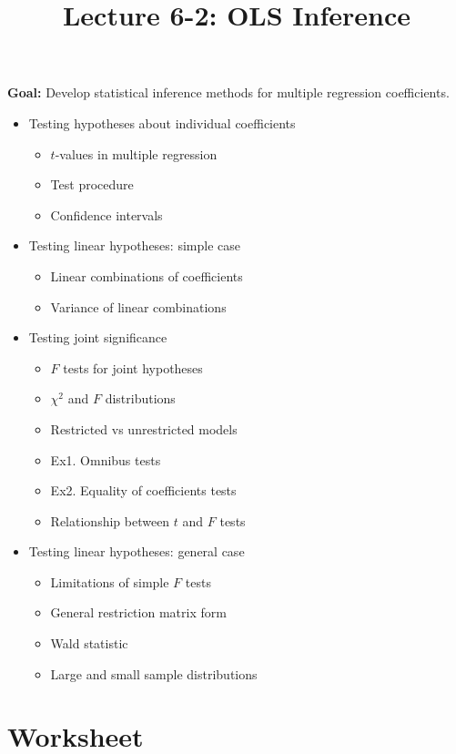 \documentclass[12pt]{article}
\title{\Large Lecture 6-2: OLS Inference}
\author{}
\date{}
\begin{document}
\maketitle
\vspace{-6em}

\noindent \textbf{Goal:} Develop statistical inference methods for multiple regression coefficients.\medskip

\begin{itemize}\setlength{\itemsep}{1em}
\item Testing hypotheses about individual coefficients
\begin{itemize}
\item $t$-values in multiple regression
\item Test procedure
\item Confidence intervals
\end{itemize}
\item Testing linear hypotheses: simple case
\begin{itemize}
\item Linear combinations of coefficients
\item Variance of linear combinations
\end{itemize}
\item Testing joint significance
\begin{itemize}
\item $F$ tests for joint hypotheses
\item $\chi^2$ and $F$ distributions
\item Restricted vs unrestricted models
\item Ex1. Omnibus tests
\item Ex2. Equality of coefficients tests
\item Relationship between $t$ and $F$ tests
\end{itemize}
\item Testing linear hypotheses: general case
\begin{itemize}
\item Limitations of simple $F$ tests
\item General restriction matrix form
\item Wald statistic
\item Large and small sample distributions
\end{itemize}
\end{itemize}

\clearpage


\section*{Worksheet}
\end{document}
